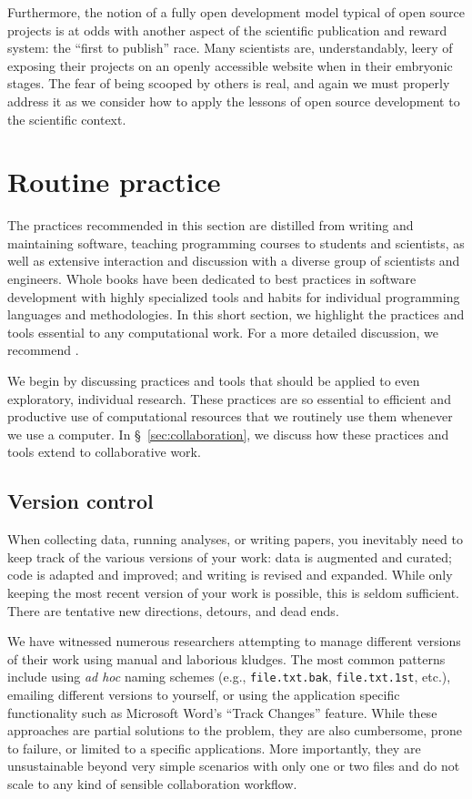 \documentclass[ChapterTOCs,krantz2]{krantz} %
\begin{document}
Furthermore, the notion of a fully open development model typical of open
source projects is at odds with another aspect of the scientific publication
and reward system: the ``first to publish'' race. Many scientists are,
understandably, leery of exposing their projects on an openly accessible
website when in their embryonic stages. The fear of being scooped by others is
real, and again we must properly address it as we consider how to apply the
lessons of open source development to the scientific context.

\section{\label{sec:practice}Routine practice}

The practices recommended in this section are distilled from writing and
maintaining software, teaching programming courses to students and scientists,
as well as extensive interaction and discussion with a diverse group of
scientists and engineers.  Whole books have been dedicated to best practices in
software development with highly specialized tools and habits for individual
programming languages and methodologies.  In this short section, we highlight
the practices and tools essential to any computational work. For a more
detailed discussion, we recommend
\cite{kernighan1999practice,HT00,2012arXiv1210.0530A}.

We begin by discussing practices and tools that should be applied to even
exploratory, individual research.  These practices are so essential to
efficient and productive use of computational resources that we routinely use
them whenever we use a computer. In §~\ref{sec:collaboration}, we discuss how these
practices and tools extend to collaborative work. 

\subsection{Version control}\label{subsec:vc}

When collecting data, running analyses, or writing papers, you inevitably need
to keep track of the various versions of your work: data is augmented and
curated; code is adapted and improved; and writing is revised and expanded.
While only keeping the most recent version of your work is possible,
this is seldom sufficient.  There are tentative new directions,
detours, and dead ends.

We have witnessed numerous researchers attempting to manage different versions
of their work using manual and laborious kludges. The most common patterns
include using \emph{ad hoc} naming schemes (e.g., \texttt{file.txt.bak},
\texttt{file.txt.1st}, etc.), emailing different versions to yourself, or using
the application specific functionality such as Microsoft Word's ``Track
Changes'' feature.  While these approaches are partial solutions to the
problem, they are also cumbersome, prone to failure, or limited to a specific
applications.  More importantly, they are unsustainable beyond very simple
scenarios with only one or two files and do not scale to any kind of sensible
collaboration workflow.
\end{document}
